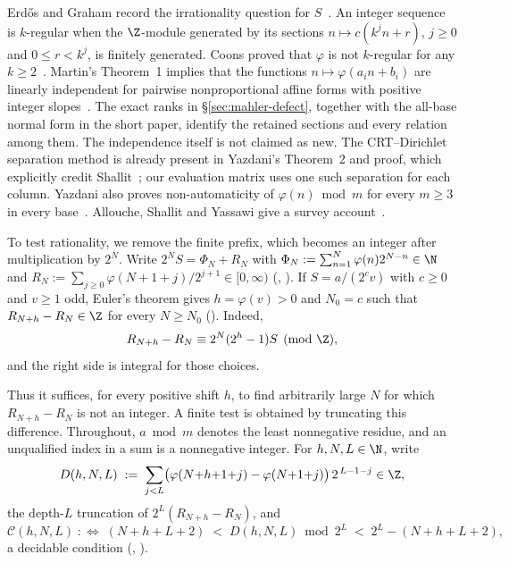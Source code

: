 \begin{rem}
Erd\H{o}s and Graham record the irrationality question for
$S$~\cite[p.~61]{erdosgraham1980}. An integer sequence is $k$-regular
when the $\Z$-module generated by its sections $n\mapsto c(k^jn+r)$,
$j\ge0$ and $0\le r<k^j$, is finitely generated. Coons proved that
$\varphi$ is not $k$-regular for any $k\ge2$~\cite[Theorem~3.2]{coons}.
Martin's
Theorem~1 implies that the functions $n\mapsto\varphi(a_in+b_i)$ are linearly
independent for pairwise nonproportional affine forms with positive integer
slopes~\cite[Theorem~1]{martin-phi-inequalities}. The exact ranks in
\S\ref{sec:mahler-defect}, together with the all-base normal form in the
short paper, identify the retained sections and every relation among them.
The independence itself is not claimed as new. The CRT--Dirichlet separation
method is already present in Yazdani's Theorem~2 and proof, which explicitly
credit Shallit~\cite[pp.~652--653]{yazdani2001}; our evaluation matrix uses
one such separation for each column. Yazdani also proves non-automaticity of
$\varphi(n)\bmod m$ for every $m\ge3$ in every base~\cite[Cor.~4]{yazdani2001}.
Allouche, Shallit and Yassawi give a survey account~\cite[Thm.~3,
Ex.~4 and Rem.~7]{allouche-shallit-yassawi}.

\end{rem}

To test rationality, we remove the finite prefix, which becomes an
integer after multiplication by $2^N$. Write $2^{N} S = \Phi_N + R_N$
with $\Phi_N := \sum_{n=1}^{N} \varphi(n) 2^{N-n} \in \N$ and
$R_N := \sum_{j \ge 0} \varphi(N+1+j)/2^{j+1} \in [0,\infty)$
(,
).
If $S=a/(2^cv)$ with $c\ge0$ and $v\ge1$ odd, Euler's theorem gives
$h=\varphi(v)>0$ and $N_0=c$ such that $R_{N+h}-R_N\in\Z$ for every
$N\ge N_0$
().
Indeed,
\[
 R_{N+h}-R_N\equiv 2^N(2^h-1)S\pmod\Z,
\]
and the right side is integral for those choices.

Thus it suffices, for every positive shift $h$, to find arbitrarily large
$N$ for which $R_{N+h}-R_N$ is not an integer. A finite test is obtained by
truncating this difference. Throughout, $a\bmod m$ denotes the least
nonnegative residue, and an unqualified index in a sum is a nonnegative
integer. For $h,N,L\in\N$, write
\[
  {D}(h,N,L)
  \;:=\; \sum_{j<L}\bigl(\varphi(N{+}h{+}1{+}j) - \varphi(N{+}1{+}j)\bigr)\,2^{\,L-1-j} \in \Z,
\]
the depth-$L$ truncation of $2^{L}(R_{N+h} - R_N)$, and
\[
  \mathcal{C}(h,N,L)
  \;:\Longleftrightarrow\;
  (N{+}h{+}L{+}2) \;<\; {D}(h,N,L) \bmod 2^{L}
  \;<\; 2^{L} - (N{+}h{+}L{+}2),
\]
a decidable condition
(,
).

